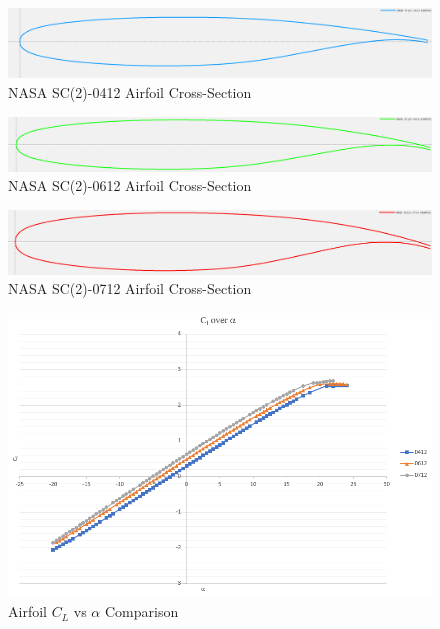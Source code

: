 \begin{figure}[!h]
    \centering
    \includegraphics[width=\textwidth]{Photos/aero/sc0412.png}
    \caption{NASA SC(2)-0412 Airfoil Cross-Section}
    \label{fig:0412airfoil}
\end{figure}
\begin{figure}[!h]
    \centering
    \includegraphics[width=\textwidth]{Photos/aero/sc0612.png}
    \caption{NASA SC(2)-0612 Airfoil Cross-Section}
    \label{fig:0612airfoil}
\end{figure}
\begin{figure}[!h]
    \centering
    \includegraphics[width=\textwidth]{Photos/aero/sc0714.png}
    \caption{NASA SC(2)-0712 Airfoil Cross-Section}
    \label{fig:0712airfoil}
\end{figure}
\clearpage
\begin{figure}[!h]
    \centering
    \includegraphics[width=\textwidth]{Photos/aero/AirfoilAnalysis.png}
    \caption{Airfoil $C_L$ vs $\alpha$ Comparison}
    \label{fig:airfoils}
\end{figure}

